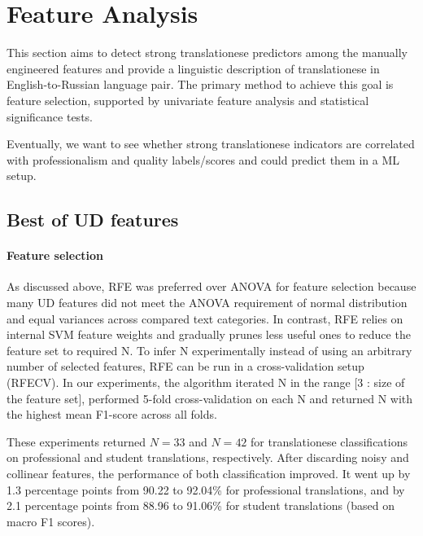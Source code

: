 \section{\label{sec:bestof}Feature Analysis}
This section aims to detect strong translationese predictors among the manually engineered features and provide a linguistic description of translationese in English-to-Russian language pair.
The primary method to achieve this goal is feature selection, supported by univariate feature analysis and statistical significance tests.

Eventually, we want to see whether strong translationese indicators are correlated with professionalism and quality labels/scores and could predict them in a ML setup. 

\subsection{\label{ssec:best_ud}Best of UD features}

\paragraph{\label{par:detect_select}Feature selection}
As discussed above, \gls{RFE} was preferred over \gls{ANOVA} for feature selection because many UD features did not meet the ANOVA requirement of normal distribution and equal variances across compared text categories. In contrast, RFE relies on internal SVM feature weights and gradually prunes less useful ones to reduce the feature set to required N. To infer N experimentally instead of using an arbitrary number of selected features, RFE can be run in a cross-validation setup (RFECV). In our experiments, the algorithm iterated N in the range [3 : size of the feature set], performed 5-fold cross-validation on each N and returned N with the highest mean F1-score across all folds.


These experiments returned $N=33$ and $N=42$ for translationese classifications on professional and student translations, respectively. 
After discarding noisy and collinear features, the performance of both classification improved. It went up by 1.3 percentage points from 90.22 to 92.04\% for professional translations, and by 2.1 percentage points from 88.96 to 91.06\% for student translations (based on macro F1 scores). %

